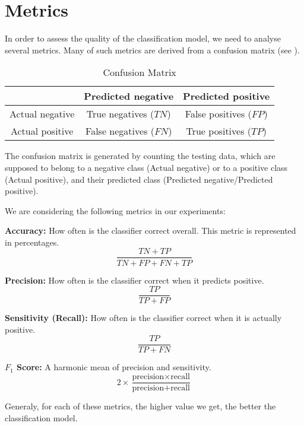 \section{Metrics}
In order to assess the quality of the classification model, we need to analyse several metrics. Many of such metrics are derived from a confusion matrix (see ).
\begin{table}[ht]
    \centering
    \begin{tabular}{|c|c|c|}
        \hline
        & Predicted negative & Predicted positive \\ 
        \hline 
        Actual negative & True negatives ($TN$) & False positives ($FP$) \\ 
        \hline
        Actual positive & False negatives ($FN$) & True positives ($TP$)  \\ 
        \hline
    \end{tabular}
    \caption{Confusion Matrix}
    \label{tab:confusion_matrix}
\end{table}
The confusion matrix is generated by counting the testing data, which are supposed to belong to a negative class (Actual negative) or to a positive class (Actual positive), and their predicted class (Predicted negative/Predicted positive).

We are considering the following metrics in our experiments:
\begin{description}
    \item{\textbf{Accuracy:}} How often is the classifier correct overall. This metric is represented in percentages.
    \begin{equation}
        \frac{TN+TP}{TN+FP+FN+TP}
        \label{eq:svm:accuracy}
    \end{equation}
    \item{\textbf{Precision:}} How often is the classifier correct when it predicts positive.
    \begin{equation}
        \frac{TP}{TP+FP}
        \label{eq:svm:precision}
    \end{equation}
    \item{\textbf{Sensitivity (Recall):}} How often is the classifier correct when it is actually positive.
    \begin{equation}
        \frac{TP}{TP+FN}
        \label{eq:svm:sensitivity}
    \end{equation}
    \item{\textbf{\( F_1 \) Score:}} A harmonic mean of precision and sensitivity.
    \begin{equation}
        2\times\frac{\text{precision}\times\text{recall}}{\text{precision}+\text{recall}}
        \label{eq:svm:F1}
    \end{equation}
\end{description}

Generaly, for each of these metrics, the higher value we get, the better the classification model.
